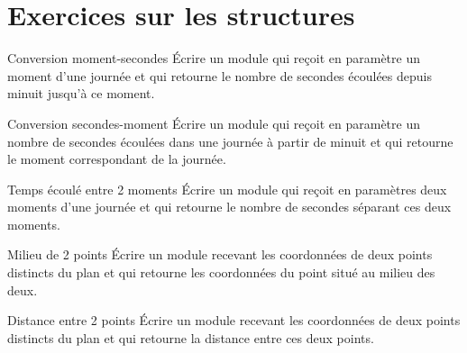 \section{Exercices sur les structures}

\begin{Exercice}{Conversion moment-secondes}
	Écrire un module qui reçoit en paramètre un
	moment d’une journée et qui retourne le nombre de secondes écoulées
	depuis minuit jusqu’à ce moment.
\end{Exercice}

\begin{Exercice}{Conversion secondes-moment}
	Écrire un module qui reçoit en paramètre un
	nombre de secondes écoulées dans une journée à partir de minuit et qui
	retourne le moment correspondant de la journée.
\end{Exercice}

\begin{Exercice}{Temps écoulé entre 2 moments}
	Écrire un module qui reçoit en paramètres deux
	moments d’une journée et qui retourne le nombre de secondes séparant
	ces deux moments.
\end{Exercice}

\begin{Exercice}{Milieu de 2 points}
	Écrire un module recevant les coordonnées de
	deux points distincts du plan et qui retourne les coordonnées du point
	situé au milieu des deux.
\end{Exercice}

\begin{Exercice}{Distance entre 2 points}
	Écrire un module recevant les coordonnées de
	deux points distincts du plan et qui retourne
	la distance entre ces deux points.
\end{Exercice}

